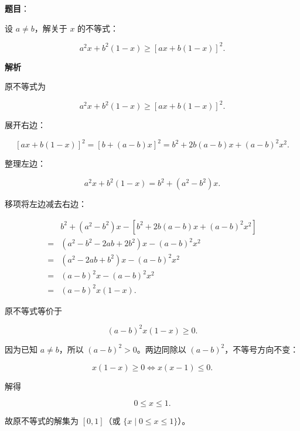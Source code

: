 \begin{answer}

\textbf{题目}：

设 $a\ne b$，解关于 $x$ 的不等式：

\nopagebreak[4]
\[
a^2x+b^2(1-x)\ge [ax+b(1-x)]^2.
\]

\textbf{解析}

原不等式为

\nopagebreak[4]
\[
a^2x+b^2(1-x)\ge [ax+b(1-x)]^2.
\]

展开右边：

\nopagebreak[4]
\[
[ax+b(1-x)]^2 = [b + (a-b)x]^2 = b^2 + 2b(a-b)x + (a-b)^2 x^2.
\]

整理左边：

\nopagebreak[4]
\[
a^2x + b^2(1-x) = b^2 + (a^2-b^2)x.
\]

移项将左边减去右边：

\nopagebreak[4]
\[
\begin{aligned}
& b^2 + (a^2-b^2)x - \left[b^2 + 2b(a-b)x + (a-b)^2 x^2\right] \\
= & \left(a^2 - b^2 - 2ab + 2b^2\right)x - (a-b)^2 x^2 \\
= & \left(a^2 - 2ab + b^2\right)x - (a-b)^2 x^2 \\
= & (a-b)^2 x - (a-b)^2 x^2 \\
= & (a-b)^2 x(1-x).
\end{aligned}
\]

原不等式等价于

\nopagebreak[4]
\[
(a-b)^2 x(1-x) \ge 0.
\]

因为已知 $a\ne b$，所以 $(a-b)^2 > 0$。两边同除以 $(a-b)^2$，不等号方向不变：

\nopagebreak[4]
\[
x(1-x) \ge 0 \iff x(x-1) \le 0.
\]

解得

\nopagebreak[4]
\[
0 \le x \le 1.
\]

故原不等式的解集为 $[0, 1]$（或 $\{x \mid 0 \le x \le 1\}$）。


\end{answer}
